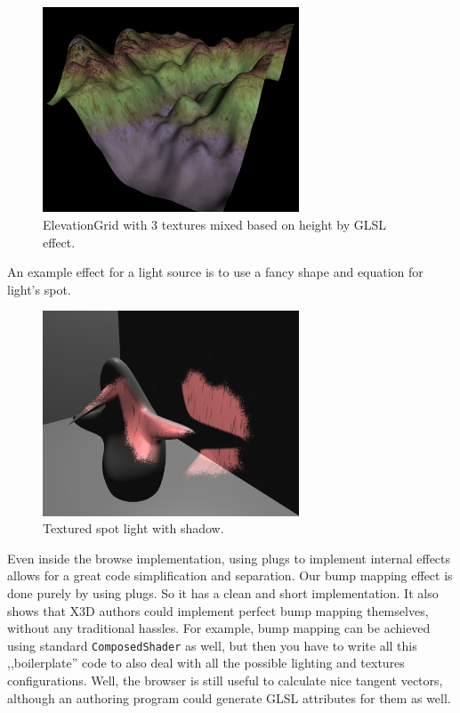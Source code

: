 \documentclass{acmsiggraph}                     %
\begin{document}
\begin{figure}[H]
  \centering
  \includegraphics[width=3in]{terrain}
  \caption{ElevationGrid with 3 textures mixed based on height by GLSL effect.}
\end{figure}

An example effect for a light source is to use a fancy shape and equation
for light's spot.

\begin{figure}[H]
  \centering
  \includegraphics[width=3in]{fancy_light_spot_shape}
  \caption{Textured spot light with shadow.}
\end{figure}

Even inside the browse implementation, using plugs to implement internal
effects allows for a great code simplification and separation.
Our bump mapping effect is done purely by using plugs.
So it has a clean and short implementation. It also shows that
X3D authors could implement perfect bump mapping themselves,
without any traditional hassles. For example, bump mapping can be
achieved using standard \texttt{ComposedShader} as well,
but then you have to write all this ,,boilerplate'' code to also deal
with all the possible lighting and textures configurations.
Well, the browser is still useful to calculate nice tangent vectors,
although an authoring program could generate GLSL attributes for them as well.
\end{document}
